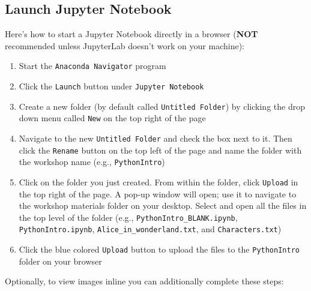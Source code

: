 \documentclass[
]{book}
\providecommand{\tightlist}{%
  \setlength{\itemsep}{0pt}\setlength{\parskip}{0pt}}
\begin{document}
\hypertarget{launch-jupyter-notebook}{%
\subsection{Launch Jupyter Notebook}\label{launch-jupyter-notebook}}

Here's how to start a Jupyter Notebook directly in a browser (\textbf{NOT} recommended unless JupyterLab doesn't work on your machine):

\begin{enumerate}
\def\labelenumi{\arabic{enumi}.}
\tightlist
\item
  Start the \texttt{Anaconda\ Navigator} program
\item
  Click the \texttt{Launch} button under \texttt{Jupyter\ Notebook}
\item
  Create a new folder (by default called \texttt{Untitled\ Folder}) by clicking the drop down menu called \texttt{New} on the top right of the page
\item
  Navigate to the new \texttt{Untitled\ Folder} and check the box next to it. Then click the \texttt{Rename} button on the top left of the page and name the folder with the workshop name (e.g., \texttt{PythonIntro})
\item
  Click on the folder you just created. From within the folder, click \texttt{Upload} in the top right of the page. A pop-up window will open; use it to navigate to the workshop materials folder on your desktop. Select and open all the files in the top level of the folder (e.g., \texttt{PythonIntro\_BLANK.ipynb}, \texttt{PythonIntro.ipynb}, \texttt{Alice\_in\_wonderland.txt}, and \texttt{Characters.txt})
\item
  Click the blue colored \texttt{Upload} button to upload the files to the \texttt{PythonIntro} folder on your browser
\end{enumerate}

Optionally, to view images inline you can additionally complete these steps:
\end{document}
